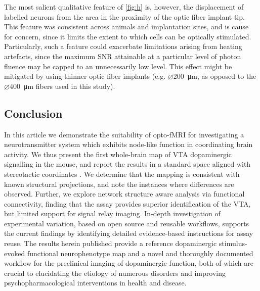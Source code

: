 The most salient qualitative feature of \cref{fig:h} is, however, the displacement of labelled neurons from the area in the proximity of the optic fiber implant tip.
This feature was consistent across animals and implantation sites, and is cause for concern, since it limits the extent to which cells can be optically stimulated.
Particularly, such a feature could exacerbate limitations arising from heating artefacts, since the maximum SNR attainable at a particular level of photon fluence may be capped to an unnecessarily low level.
This effect might be mitigated by using thinner optic fiber implants (e.g. $\diameter$\SI{200}{\micro\meter}, as opposed to the $\diameter$\SI{400}{\micro\meter} fibers used in this study).

\subsection{Conclusion}

In this article we demonstrate the suitability of opto-fMRI for investigating a neurotransmitter system which exhibits node-like function in coordinating brain activity.
We thus present the first whole-brain map of VTA dopaminergic signalling in the mouse, and report the results in a standard space aligned with stereotactic coordinates \cite{me}.
We determine that the mapping is consistent with known structural projections, and note the instances where differences are observed.
Further, we explore network structure aware analysis via functional connectivity, finding that the assay provides superior identification of the VTA, but limited support for signal relay imaging.
In-depth investigation of experimental variation, based on open source and reusable workflows, supports the current findings by identifying detailed evidence-based instructions for assay reuse.
The results herein published provide a reference dopaminergic stimulus-evoked functional neurophenotype map and a novel and thoroughly documented workflow for the preclinical imaging of dopaminergic function, both of which are crucial to elucidating the etiology of numerous disorders and improving psychopharmacological interventions in health and disease.
